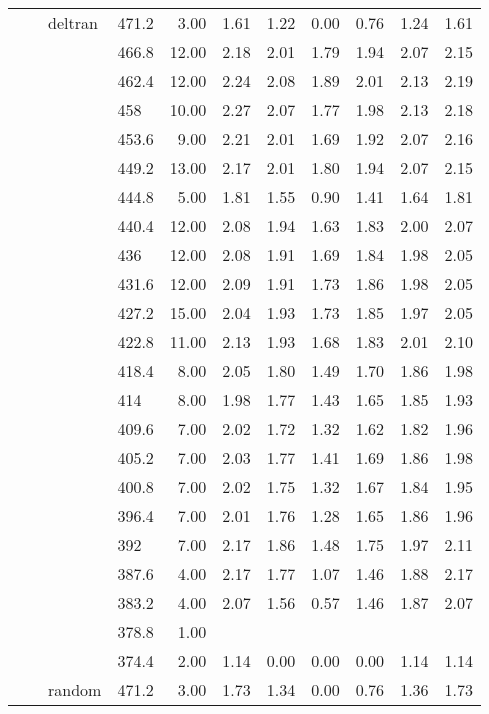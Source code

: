\begin{longtable}{llllrrrrrrr}
   &  & deltran & 471.2 & 3.00 & 1.61 & 1.22 & 0.00 & 0.76 & 1.24 & 1.61 \\ 
   &  &  & 466.8 & 12.00 & 2.18 & 2.01 & 1.79 & 1.94 & 2.07 & 2.15 \\ 
   &  &  & 462.4 & 12.00 & 2.24 & 2.08 & 1.89 & 2.01 & 2.13 & 2.19 \\ 
   &  &  & 458 & 10.00 & 2.27 & 2.07 & 1.77 & 1.98 & 2.13 & 2.18 \\ 
   &  &  & 453.6 & 9.00 & 2.21 & 2.01 & 1.69 & 1.92 & 2.07 & 2.16 \\ 
   &  &  & 449.2 & 13.00 & 2.17 & 2.01 & 1.80 & 1.94 & 2.07 & 2.15 \\ 
   &  &  & 444.8 & 5.00 & 1.81 & 1.55 & 0.90 & 1.41 & 1.64 & 1.81 \\ 
   &  &  & 440.4 & 12.00 & 2.08 & 1.94 & 1.63 & 1.83 & 2.00 & 2.07 \\ 
   &  &  & 436 & 12.00 & 2.08 & 1.91 & 1.69 & 1.84 & 1.98 & 2.05 \\ 
   &  &  & 431.6 & 12.00 & 2.09 & 1.91 & 1.73 & 1.86 & 1.98 & 2.05 \\ 
   &  &  & 427.2 & 15.00 & 2.04 & 1.93 & 1.73 & 1.85 & 1.97 & 2.05 \\ 
   &  &  & 422.8 & 11.00 & 2.13 & 1.93 & 1.68 & 1.83 & 2.01 & 2.10 \\ 
   &  &  & 418.4 & 8.00 & 2.05 & 1.80 & 1.49 & 1.70 & 1.86 & 1.98 \\ 
   &  &  & 414 & 8.00 & 1.98 & 1.77 & 1.43 & 1.65 & 1.85 & 1.93 \\ 
   &  &  & 409.6 & 7.00 & 2.02 & 1.72 & 1.32 & 1.62 & 1.82 & 1.96 \\ 
   &  &  & 405.2 & 7.00 & 2.03 & 1.77 & 1.41 & 1.69 & 1.86 & 1.98 \\ 
   &  &  & 400.8 & 7.00 & 2.02 & 1.75 & 1.32 & 1.67 & 1.84 & 1.95 \\ 
   &  &  & 396.4 & 7.00 & 2.01 & 1.76 & 1.28 & 1.65 & 1.86 & 1.96 \\ 
   &  &  & 392 & 7.00 & 2.17 & 1.86 & 1.48 & 1.75 & 1.97 & 2.11 \\ 
   &  &  & 387.6 & 4.00 & 2.17 & 1.77 & 1.07 & 1.46 & 1.88 & 2.17 \\ 
   &  &  & 383.2 & 4.00 & 2.07 & 1.56 & 0.57 & 1.46 & 1.87 & 2.07 \\ 
   &  &  & 378.8 & 1.00 &  &  &  &  &  &  \\ 
   &  &  & 374.4 & 2.00 & 1.14 & 0.00 & 0.00 & 0.00 & 1.14 & 1.14 \\ 
   &  & random & 471.2 & 3.00 & 1.73 & 1.34 & 0.00 & 0.76 & 1.36 & 1.73 \\ 

\end{longtable}
